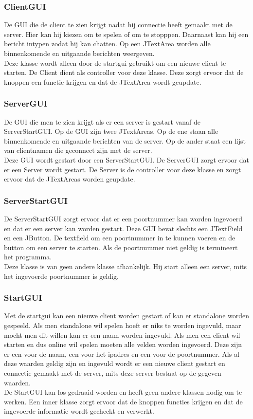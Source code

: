\documentclass[12pt]{article}
\begin{document}
\subsubsection{ClientGUI}
De GUI die de client te zien krijgt nadat hij connectie heeft gemaakt met de server. Hier kan hij kiezen om te spelen of om te stopppen. Daarnaast kan hij een bericht intypen zodat hij kan chatten. Op een JTextArea worden alle binnenkomende en uitgaande berichten weergeven.\\
Deze klasse wordt alleen door de startgui gebruikt om een nieuwe client te starten. De Client dient als controller voor deze klasse. Deze zorgt ervoor dat de knoppen een functie krijgen en dat de JTextArea wordt geupdate.
\subsubsection{ServerGUI}
De GUI die men te zien krijgt als er een server is gestart vanaf de ServerStartGUI. Op de GUI zijn twee JTextAreas. Op de ene staan alle binnenkomende en uitgaande berichten van de server. Op de ander staat een lijst van clientnamen die geconnect zijn met de server.\\
Deze GUI wordt gestart door een ServerStartGUI. De ServerGUI zorgt ervoor dat er een Server wordt gestart. De Server is de controller voor deze klasse en zorgt ervoor dat de JTextAreas worden geupdate.
\subsubsection{ServerStartGUI}
De ServerStartGUI zorgt ervoor dat er een poortnummer kan worden ingevoerd en dat er een server kan worden gestart. Deze GUI bevat slechts een JTextField en een JButton. De textfield om een poortnummer in te kunnen voeren en de button om een server te starten. Als de poortnummer niet geldig is termineert het programma.\\
Deze klasse is van geen andere klasse afhankelijk. Hij start alleen een server, mits het ingevoerde poortnummer is geldig.
\subsubsection{StartGUI}
Met de startgui kan een nieuwe client worden gestart of kan er standalone worden gespeeld. Als men standalone wil spelen hoeft er niks te worden ingevuld, maar mocht men dit willen kan er een naam worden ingevuld. Als men een client wil starten en dus online wil spelen moeten alle velden worden ingevoerd. Deze zijn er een voor de naam, een voor het ipadres en een voor de poortnummer. Als al deze waarden geldig zijn en ingevuld wordt er een nieuwe client gestart en connectie gemaakt met de server, mits deze server bestaat op de gegeven waarden.\\
De StartGUI kan los gedraaid worden en heeft geen andere klassen nodig om te werken. Een inner klasse zorgt ervoor dat de knoppen functies krijgen en dat de ingevoerde informatie wordt gecheckt en verwerkt.
\end{document}

